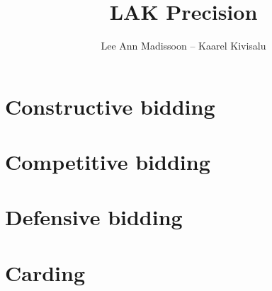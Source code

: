 \documentclass[11pt]{report}
\title{LAK Precision}
\author{Lee Ann Madissoon -- Kaarel Kivisalu}
\begin{document}
\maketitle
\tableofcontents


\chapter{Constructive bidding}













\chapter{Competitive bidding}

\chapter{Defensive bidding}

\chapter{Carding}

\end{document}
